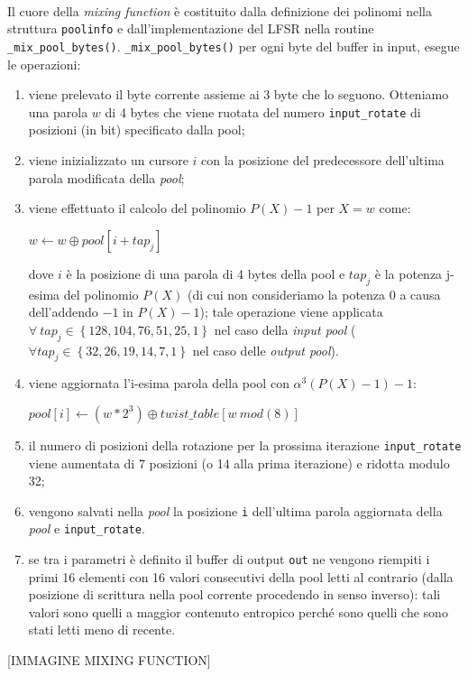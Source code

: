 \documentclass{article}
\begin{document}
 \paragraph{} Il cuore della \emph{mixing function} è costituito dalla
 definizione dei polinomi nella struttura \verb+poolinfo+ e dall'implementazione
 del LFSR nella routine \verb+_mix_pool_bytes()+. 
 \newline \verb+_mix_pool_bytes()+ per ogni byte del buffer in input, esegue le
 operazioni:
 \begin{enumerate}
   \item viene prelevato il byte corrente assieme ai 3 byte che lo seguono.
   Otteniamo una parola $w$ di 4 bytes che viene ruotata del numero
   \verb+input_rotate+ di posizioni (in bit) specificato dalla pool;
   \item viene inizializzato un cursore $i$ con la posizione del
   predecessore dell'ultima parola modificata della \emph{pool};
   \item viene effettuato il calcolo del polinomio $P(X)-1$ per $X=w$
   come:
   \begin{center}
   $w\leftarrow w \oplus pool[i + tap_j]$
   \end{center}
   dove $i$ è la posizione di una parola di 4 bytes della pool e $tap_j$ è la
   potenza j-esima del polinomio $P(X)$ (di cui non consideriamo la potenza 0
   a causa dell'addendo $-1$ in $P(X)-1$); tale operazione viene applicata 
   $\forall\ tap_j \in \left\{128, 104, 76, 51, 25, 1 \right\}$ nel caso della
   \emph{input pool} ($\forall tap_j \in \left\{32, 26, 19, 14, 7, 1 \right\}$
   nel caso delle \emph{output pool}).
   \item viene aggiornata l'i-esima parola della pool con 
   $\alpha^3\left(P(X)-1\right)-1$:
   \begin{center}
   $pool\left[i\right] \leftarrow  \left(w*2^3\right) \oplus
   twist\_table\left[w\ mod(8)\right]$
   \end{center}
   \item il numero di posizioni della rotazione per la prossima iterazione
   \verb+input_rotate+ viene aumentata di 7 posizioni (o 14 alla prima
   iterazione) e ridotta modulo 32;
   \item vengono salvati nella \emph{pool} la posizione \verb+i+ dell'ultima
   parola aggiornata della \emph{pool} e \verb+input_rotate+.
   \item se tra i parametri è definito il buffer di output \verb+out+ ne vengono
   riempiti i primi 16 elementi con 16 valori consecutivi della pool letti al
   contrario (dalla posizione di scrittura nella pool corrente procedendo in
   senso inverso): tali valori sono quelli a maggior contenuto entropico
   perché sono quelli che sono stati letti meno di recente.
 \end{enumerate}
 \begin{center}
 [IMMAGINE MIXING FUNCTION]
 \end{center}
\end{document}
